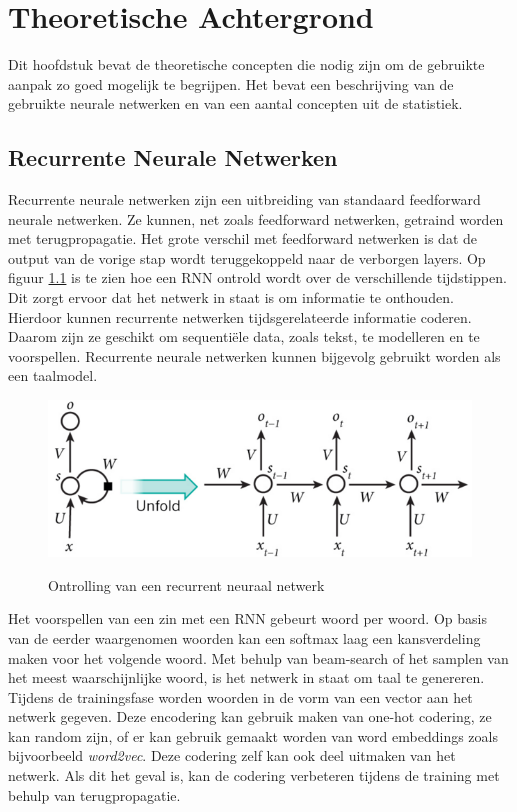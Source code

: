 \chapter{Theoretische Achtergrond}
\label{hst-theorie}
Dit hoofdstuk bevat de theoretische concepten die nodig zijn om de gebruikte aanpak zo goed mogelijk te begrijpen. Het bevat een beschrijving van de gebruikte neurale netwerken en van een aantal concepten uit de statistiek.


\section{Recurrente Neurale Netwerken}
Recurrente neurale netwerken zijn een uitbreiding van standaard feedforward neurale netwerken. Ze kunnen, net zoals feedforward netwerken, getraind worden met terugpropagatie. Het grote verschil met feedforward netwerken is dat de output van de vorige stap wordt teruggekoppeld naar de verborgen layers. Op figuur \ref{fig:rnn} is te zien hoe een RNN ontrold wordt over de verschillende tijdstippen. Dit zorgt ervoor dat het netwerk in staat is om informatie te onthouden. Hierdoor kunnen recurrente netwerken tijdsgerelateerde informatie coderen. Daarom zijn ze geschikt om sequenti\"ele data, zoals tekst, te modelleren en te voorspellen. Recurrente neurale netwerken kunnen bijgevolg gebruikt worden als een taalmodel.\

\begin{figure}[tb]
    \centering
    \includegraphics[width=\linewidth]{Images/rnn.PNG}
    \label{fig:rnn}
    \caption{Ontrolling van een recurrent neuraal netwerk}
\end{figure}

Het voorspellen van een zin met een RNN gebeurt woord per woord. Op basis van de eerder waargenomen woorden kan een softmax laag een kansverdeling maken voor het volgende woord. Met behulp van beam-search of het samplen van het meest waarschijnlijke woord, is het netwerk in staat om taal te genereren. Tijdens de trainingsfase worden woorden in de vorm van een vector aan het netwerk gegeven. Deze encodering kan gebruik maken van one-hot codering, ze kan random zijn, of er kan gebruik gemaakt worden van word embeddings zoals bijvoorbeeld \emph{word2vec}\cite{Mikolov2013}. Deze codering zelf kan ook deel uitmaken van het netwerk. Als dit het geval is, kan de codering verbeteren tijdens de training met behulp van terugpropagatie.

